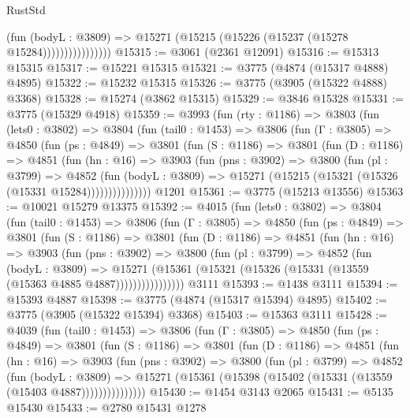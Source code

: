 \begin{lexlean}{RustStd}
\begin{coremodule}
{\begin{coremodule}
{{{{{{{{{{{{{{{{{{{{{{{{{{{{{{{                          (fun (bodyL : @3809) =>
                          @15271 (@15215 (@15226 (@15237 (@15278 @15284))))))))))))))))
@15315 := @3061 (@2361 @12091)
@15316 := @15313 @15315
@15317 := @15221 @15315
@15321 := @3775 (@4874 (@15317 @4888) @4895)
@15322 := @15232 @15315
@15326 := @3775 (@3905 (@15322 @4888) @3368)
@15328 := @15274 (@3862 @15315)
@15329 := @3846 @15328
@15331 := @3775 (@15329 @4918)
@15359 := @3993
    (fun (rty : @1186) =>
    @3803
      (fun (lets0 : @3802) =>
      @3804
        (fun (tail0 : @1453) =>
        @3806
          (fun (Γ : @3805) =>
          @4850
            (fun (ps : @4849) =>
            @3801
              (fun (S : @1186) =>
              @3801
                (fun (D : @1186) =>
                @4851
                  (fun (hn : @16) =>
                  @3903
                    (fun (pns : @3902) =>
                    @3800
                      (fun (pl : @3799) =>
                      @4852
                        (fun (bodyL : @3809) =>
                        @15271 (@15215 (@15321 (@15326 (@15331 @15284)))))))))))))))
    @1201
@15361 := @3775 (@15213 @13556)
@15363 := @10021 @15279 @13375
@15392 := @4015
    (fun (lets0 : @3802) =>
    @3804
      (fun (tail0 : @1453) =>
      @3806
        (fun (Γ : @3805) =>
        @4850
          (fun (ps : @4849) =>
          @3801
            (fun (S : @1186) =>
            @3801
              (fun (D : @1186) =>
              @4851
                (fun (hn : @16) =>
                @3903
                  (fun (pns : @3902) =>
                  @3800
                    (fun (pl : @3799) =>
                    @4852
                      (fun (bodyL : @3809) =>
                      @15271
                        (@15361 (@15321 (@15326 (@15331 (@13559 (@15363 @4885 @4887))))))))))))))))
    @3111
@15393 := @1438 @3111
@15394 := @15393 @4887
@15398 := @3775 (@4874 (@15317 @15394) @4895)
@15402 := @3775 (@3905 (@15322 @15394) @3368)
@15403 := @15363 @3111
@15428 := @4039
    (fun (tail0 : @1453) =>
    @3806
      (fun (Γ : @3805) =>
      @4850
        (fun (ps : @4849) =>
        @3801
          (fun (S : @1186) =>
          @3801
            (fun (D : @1186) =>
            @4851
              (fun (hn : @16) =>
              @3903
                (fun (pns : @3902) =>
                @3800
                  (fun (pl : @3799) =>
                  @4852
                    (fun (bodyL : @3809) =>
                    @15271 (@15361 (@15398 (@15402 (@15331 (@13559 (@15403 @4887)))))))))))))))
@15430 := @1454 @3143 @2065
@15431 := @5135 @15430
@15433 := @2780 @15431 @1278
}}}}}}}}}}}}}}}}}}}}}}}}}}}}}}}
\end{coremodule}}
\end{coremodule}
\end{lexlean}
